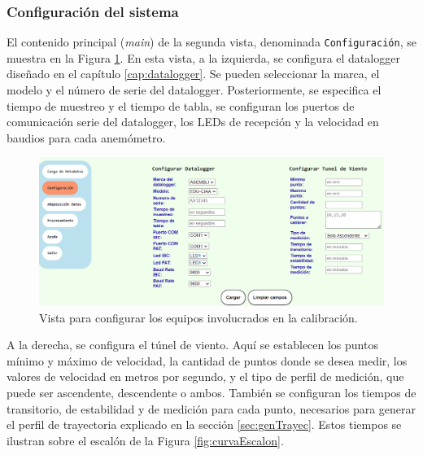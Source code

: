 \subsubsection{Configuración del sistema}\label{sec:configSistema}

El contenido principal (\textit{main}) de la segunda vista, denominada \texttt{Configuración}, se muestra en la Figura \ref{fig:configEquipos}. En esta vista, a la izquierda, se configura el datalogger diseñado en el capítulo \ref{cap:datalogger}. Se pueden seleccionar la marca, el modelo y el número de serie del datalogger. Posteriormente, se especifica el tiempo de muestreo y el tiempo de tabla, se configuran los puertos de comunicación serie del datalogger, los LEDs de recepción y la velocidad en baudios para cada anemómetro.

\begin{figure}[H]
    \centering
    \includegraphics[width=1\linewidth]{Figuras/AplicacionWeb/frondend/configEquipos.png}
    \caption{Vista para configurar los equipos involucrados en la calibración.}
    \label{fig:configEquipos}
\end{figure}

A la derecha, se configura el túnel de viento. Aquí se establecen los puntos mínimo y máximo de velocidad, la cantidad de puntos donde se desea medir, los valores de velocidad en metros por segundo, y el tipo de perfil de medición, que puede ser ascendente, descendente o ambos. También se configuran los tiempos de transitorio, de estabilidad y de medición para cada punto, necesarios para generar el perfil de trayectoria explicado en la sección \ref{sec:genTrayec}. Estos tiempos se ilustran sobre el escalón de la Figura \ref{fig:curvaEscalon}.

